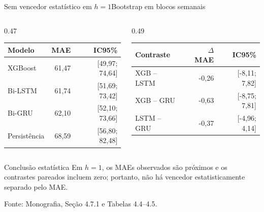 \documentclass[10pt]{beamer}
\newcommand{\source}[1]{%
  \par\vfill{\raggedleft\tiny\color{gray}Fonte: #1\par}%
}
\begin{document}
\begin{frame}{Sem vencedor estatístico em $h=1$}{Bootstrap em blocos semanais}
  \begin{columns}[T,onlytextwidth]
    \begin{column}{0.47\textwidth}
      \scriptsize
      \begin{tabular}{lrr}
        \toprule
        \textbf{Modelo} & \textbf{MAE} & \textbf{IC95\%} \\
        \midrule
        XGBoost & 61,47 & [49,97; 74,64] \\
        Bi-LSTM & 61,74 & [51,69; 73,42] \\
        Bi-GRU & 62,10 & [52,10; 73,66] \\
        Persistência & 68,59 & [56,80; 82,48] \\
        \bottomrule
      \end{tabular}
    \end{column}
    \begin{column}{0.49\textwidth}
      \scriptsize
      \begin{tabular}{lrr}
        \toprule
        \textbf{Contraste} & \textbf{$\Delta$ MAE} & \textbf{IC95\%} \\
        \midrule
        XGB -- LSTM & -0,26 & [-8,11; 7,82] \\
        XGB -- GRU & -0,63 & [-8,75; 7,81] \\
        LSTM -- GRU & -0,37 & [-4,96; 4,14] \\
        \bottomrule
      \end{tabular}
    \end{column}
  \end{columns}

  \vspace{0.9em}
  \begin{block}{Conclusão estatística}
    Em $h=1$, os MAEs observados são próximos e os contrastes pareados incluem zero; portanto, não há vencedor estatisticamente separado pelo MAE.
  \end{block}

  \source{Monografia, Seção 4.7.1 e Tabelas 4.4--4.5.}
\end{frame}
\end{document}
